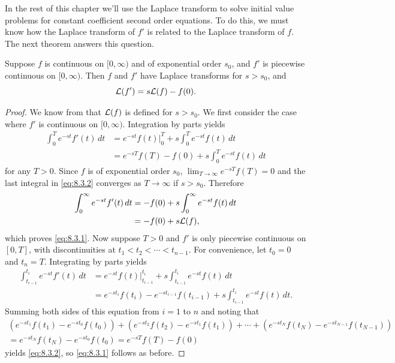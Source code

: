 
In the rest of this chapter we'll use the Laplace transform to solve
initial value problems for constant coefficient second order
equations. To do this, we must know how the Laplace transform of
 $f'$ is related to the Laplace transform of $f$. The
next theorem answers this question.

\begin{theorem}\label{thmtype:8.3.1}
 Suppose $f$ is continuous
on $[0,\infty)$ and of exponential order $s_0$, and $f'$ is piecewise
continuous on $[0,\infty)$.  Then $f$ and $f'$ have Laplace transforms for
$s > s_0$, and
\begin{equation}\label{eq:8.3.1}
{\mathcal L}(f')=s {\mathcal L}(f)-f(0).
\end{equation}
\end{theorem}

\begin{proof}
We know from  that ${\mathcal L}(f)$ is defined for
$s>s_0$.
We first consider the case where $f'$ is continuous on $[0,\infty)$.
Integration by parts yields
\begin{equation}\label{eq:8.3.2}
\begin{aligned}
\int^T_0 e^{-st}f'(t)\,dt
&=e^{-st}f(t)\Big|^T_0+s\int^T_0e^{-st}f(t)\,dt\\
&=e^{-sT}f(T)-f(0)+s\int^T_0 e^{-st}f(t)\,dt
\end{aligned}
\end{equation}
for any $T>0$. Since $f$ is of exponential order $s_0$,
 $\lim_{T\to \infty}e^{-sT}f(T)=0$ and the last integral in
\eqref{eq:8.3.2} converges as $T\to\infty$ if $s> s_0$. Therefore
\begin{align*}
\int^\infty_0 e^{-st}f'(t)\,dt
&=-f(0)+s\int^\infty_0 e^{-st}f(t)\,dt\\
&=-f(0)+s{\mathcal L}(f),
\end{align*}
which proves \eqref{eq:8.3.1}.
Now suppose $T>0$ and $f'$ is only piecewise continuous on
$[0,T]$, with discontinuities at $t_1 <  t_2 <\cdots <  t_{n-1}$. For
convenience,  let  $t_0=0$  and  $t_n=T$.  Integrating by parts yields
\begin{align*}
\int^{t_i}_{t_{i-1}}e^{-st}f'(t)\,dt
&=e^{-st}f(t)\Big|^{t_i}_{t_{i-1}}+s\int^{t_i}_{t_{i-1}}e^{-st}f(t)\,dt\\
&=e^{-st_i}f(t_i)-e^{-st_{i-1}}f(t_{i-1})+s\int^{t_i}_{t_{i-1}}e^{-st}f(t)\,dt.
\end{align*}
Summing both sides of this equation from $i=1$ to  $n$
and noting that
\begin{multline*}
\left(e^{-st_1}f(t_1)-e^{-st_0}f(t_0)\right)+\left(e^{-st_2}
f(t_2)-e^{-st_1}f(t_1)\right)
+\cdots+\left(e^{-st_N}f(t_N)-e^{-st_{N-1}}f(t_{N-1})\right)\\
=e^{-st_N}f(t_N)-e^{-st_0}f(t_0)=e^{-sT}f(T)-f(0)
\end{multline*}
yields \eqref{eq:8.3.2}, so \eqref{eq:8.3.1} follows as before.
\end{proof}

